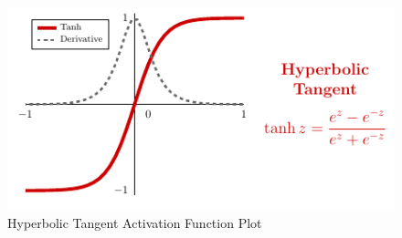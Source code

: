 \vspace{1cm}
\begin{figure}[!htbp]
    \centering
    \includegraphics[scale=2]{tikz/chapter1 - Hyperbolic Tangent.pdf}
    \caption{Hyperbolic Tangent Activation Function Plot}
\end{figure}

\newpage
